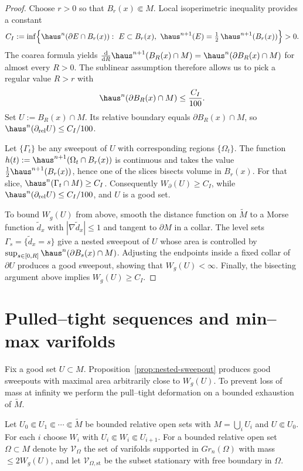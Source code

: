 \begin{proof}
Choose $r>0$ so that $B_r(x)\Subset M$.  Local isoperimetric inequality provides a constant
\[
C_I:=\inf\Bigl\{\haus^n(\partial E\cap B_r(x)):\ E\subset B_r(x),\
\haus^{n+1}(E)=\tfrac12\,\haus^{n+1}(B_r(x))\Bigr\}>0.
\]
The coarea formula yields $\frac{\mathrm{d}}{\mathrm{d}R}\haus^{n+1}(B_R(x)\cap M)=\haus^n(\partial B_R(x)\cap M)$ for almost every $R>0$.  The sublinear assumption therefore allows us to pick a regular value $R>r$ with
\[
\haus^n(\partial B_R(x)\cap M)\le \frac{C_I}{100}.
\]
Set $U:=B_R(x)\cap M$.  Its relative boundary equals $\partial B_R(x)\cap M$, so $\haus^{n}(\partial_{\mathrm{rel}}U)\le C_I/100$.

Let $\{\Gamma_t\}$ be any sweepout of $U$ with corresponding regions $\{\Omega_t\}$.  The function $h(t):=\haus^{n+1}(\Omega_t\cap B_r(x))$ is continuous and takes the value $\tfrac12\haus^{n+1}(B_r(x))$, hence one of the slices bisects volume in $B_r(x)$.  For that slice, $\haus^{n}(\Gamma_t\cap M)\ge C_I$.  Consequently $W_\partial(U)\ge C_I$, while $\haus^{n}(\partial_{\mathrm{rel}}U)\le C_I/100$, and $U$ is a good set.

To bound $W_g(U)$ from above, smooth the distance function on $\widetilde M$ to a Morse function $\tilde d_x$ with $|\nabla \tilde d_x|\le 1$ and tangent to $\partial M$ in a collar.  The level sets $\Gamma_s=\{\tilde d_x=s\}$ give a nested sweepout of $U$ whose area is controlled by $\sup_{s\in[0,R]}\haus^n(\partial B_s(x)\cap M)$.  Adjusting the endpoints inside a fixed collar of $\partial U$ produces a good sweepout, showing that $W_g(U)<\infty$.  Finally, the bisecting argument above implies $W_g(U)\ge C_I$.
\end{proof}

\section{Pulled--tight sequences and min--max varifolds}
Fix a good set $U\subset M$.  Proposition~\ref{prop:nested-sweepout} produces good sweepouts with maximal area arbitrarily close to $W_g(U)$.  To prevent loss of mass at infinity we perform the pull--tight deformation on a bounded exhaustion of $\widetilde M$.

Let $U_0\Subset U_1\Subset\cdots\Subset \widetilde M$ be bounded relative open sets with $M=\bigcup_i U_i$ and $U\Subset U_0$.  For each $i$ choose $W_i$ with $U_i\Subset W_i\Subset U_{i+1}$.  For a bounded relative open set $\Omega\subset M$ denote by $\mathcal{V}_\Omega$ the set of varifolds supported in $Gr_n(\Omega)$ with mass $\le 2W_g(U)$, and let $\mathcal{V}_{\Omega,\mathrm{st}}$ be the subset stationary with free boundary in $\Omega$.

